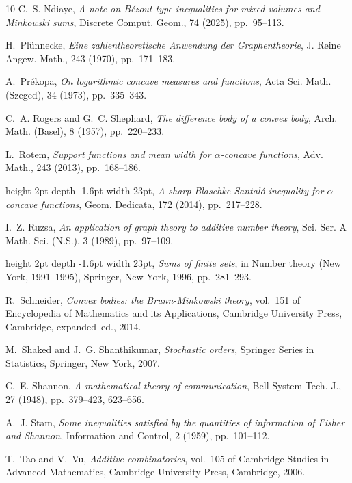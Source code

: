\documentclass[11pt]{amsart}
\theoremstyle{plain}
\theoremstyle{definition}
\theoremstyle{remark}
\begin{document}
\begin{thebibliography}{10}
{\sc C.~S. Ndiaye}, {\em A note on {B}\'ezout type inequalities for mixed volumes and {M}inkowski sums}, Discrete Comput. Geom., 74 (2025), pp.~95--113.

{\sc H.~Pl\"unnecke}, {\em Eine zahlentheoretische {A}nwendung der {G}raphentheorie}, J. Reine Angew. Math., 243 (1970), pp.~171--183.

{\sc A.~Pr\'ekopa}, {\em On logarithmic concave measures and functions}, Acta Sci. Math. (Szeged), 34 (1973), pp.~335--343.

{\sc C.~A. Rogers and G.~C. Shephard}, {\em The difference body of a convex body}, Arch. Math. (Basel), 8 (1957), pp.~220--233.

{\sc L.~Rotem}, {\em Support functions and mean width for {$\alpha$}-concave functions}, Adv. Math., 243 (2013), pp.~168--186.

\leavevmode\vrule height 2pt depth -1.6pt width 23pt, {\em A sharp {B}laschke-{S}antal\'o{} inequality for {$\alpha$}-concave functions}, Geom. Dedicata, 172 (2014), pp.~217--228.

{\sc I.~Z. Ruzsa}, {\em An application of graph theory to additive number theory}, Sci. Ser. A Math. Sci. (N.S.), 3 (1989), pp.~97--109.

\leavevmode\vrule height 2pt depth -1.6pt width 23pt, {\em Sums of finite sets}, in Number theory ({N}ew {Y}ork, 1991--1995), Springer, New York, 1996, pp.~281--293.

{\sc R.~Schneider}, {\em Convex bodies: the {B}runn-{M}inkowski theory}, vol.~151 of Encyclopedia of Mathematics and its Applications, Cambridge University Press, Cambridge, expanded~ed., 2014.

{\sc M.~Shaked and J.~G. Shanthikumar}, {\em Stochastic orders}, Springer Series in Statistics, Springer, New York, 2007.

{\sc C.~E. Shannon}, {\em A mathematical theory of communication}, Bell System Tech. J., 27 (1948), pp.~379--423, 623--656.

{\sc A.~J. Stam}, {\em Some inequalities satisfied by the quantities of information of {F}isher and {S}hannon}, Information and Control, 2 (1959), pp.~101--112.

{\sc T.~Tao and V.~Vu}, {\em Additive combinatorics}, vol.~105 of Cambridge Studies in Advanced Mathematics, Cambridge University Press, Cambridge, 2006.

\end{thebibliography}


% 
\end{document}
